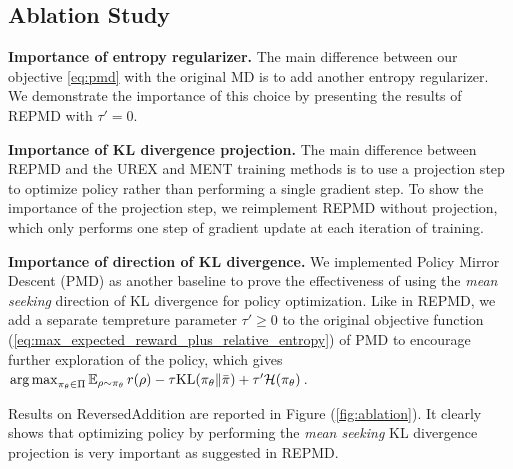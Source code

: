 
\subsection{Ablation Study}
\label{subsec:ablationstudy}

\textbf{Importance of entropy regularizer.} The main difference between our objective \cref{eq:pmd} with the original MD is to add another entropy regularizer. We demonstrate the importance of this choice by presenting the results of REPMD with $\tau'=0$.

\textbf{Importance of KL divergence projection.} The main difference between REPMD and the UREX and MENT training methods is to use a projection step to optimize policy rather than performing a single gradient step. To show the importance of the projection step, we reimplement REPMD without projection, which only performs one step of gradient update at each iteration of training. 

\textbf{Importance of direction of KL divergence.} We implemented Policy Mirror Descent (PMD) as another baseline to prove the effectiveness of using the \emph{mean seeking} direction of KL divergence for policy optimization. Like in REPMD, we add a separate tempreture parameter $\tau'\geq 0$ to the original objective function (\ref{eq:max_expected_reward_plus_relative_entropy}) of PMD to encourage further exploration of the policy, which gives $\operatorname*{arg\,max}_{\pi_\theta \in \Pi}{ \operatorname*{\mathbb{E}}_{\rho \sim \pi_\theta}{  r(\rho)  - \tau \text{KL}(\pi_\theta \| \bar{\pi}) } + \tau'\mathcal{H}(\pi_\theta) }$.

Results on ReversedAddition are reported in Figure (\ref{fig:ablation}). It clearly shows that optimizing policy by performing the \emph{mean seeking} KL divergence projection is very important as suggested in REPMD. 
